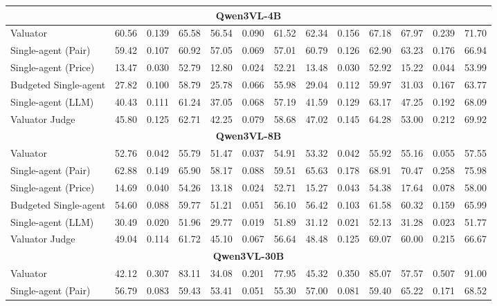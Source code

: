 \begin{table}[!t]
{\begin{tabular}{lcccccccccccc}
\midrule
\multicolumn{13}{c}{\textbf{Qwen3VL-4B}} \\
\midrule
Valuator                     & 60.56 & 0.139 & 65.58 & 56.54 & 0.090 & 61.52 & 62.34 & 0.156 & 67.18 & 67.97 & 0.239 & 71.70 \\
Single-agent (Pair)          & 59.42 & 0.107 & 60.92 & 57.05 & 0.069 & 57.01 & 60.79 & 0.126 & 62.90 & 63.23 & 0.176 & 66.94 \\
Single-agent (Price)         & 13.47 & 0.030 & 52.79 & 12.80 & 0.024 & 52.21 & 13.48 & 0.030 & 52.92 & 15.22 & 0.044 & 53.99 \\
Budgeted Single-agent        & 27.82 & 0.100 & 58.79 & 25.78 & 0.066 & 55.98 & 29.04 & 0.112 & 59.97 & 31.03 & 0.167 & 63.77 \\
Single-agent (LLM)           & 40.43 & 0.111 & 61.24 & 37.05 & 0.068 & 57.19 & 41.59 & 0.129 & 63.17 & 47.25 & 0.192 & 68.09 \\
Valuator Judge               & 45.80 & 0.125 & 62.71 & 42.25 & 0.079 & 58.68 & 47.02 & 0.145 & 64.28 & 53.00 & 0.212 & 69.92 \\
\midrule
\multicolumn{13}{c}{\textbf{Qwen3VL-8B}} \\
\midrule
Valuator                     & 52.76 & 0.042 & 55.79 & 51.47 & 0.037 & 54.91 & 53.32 & 0.042 & 55.92 & 55.16 & 0.055 & 57.55 \\
Single-agent (Pair)          & 62.88 & 0.149 & 65.90 & 58.17 & 0.088 & 59.51 & 65.63 & 0.178 & 68.91 & 70.47 & 0.258 & 75.98 \\
Single-agent (Price)         & 14.69 & 0.040 & 54.26 & 13.18 & 0.024 & 52.71 & 15.27 & 0.043 & 54.38 & 17.64 & 0.078 & 58.00 \\
Budgeted Single-agent        & 54.60 & 0.088 & 59.77 & 51.21 & 0.051 & 56.10 & 56.42 & 0.103 & 61.58 & 60.32 & 0.159 & 65.99 \\
Single-agent (LLM)           & 30.49 & 0.020 & 51.96 & 29.77 & 0.019 & 51.89 & 31.12 & 0.021 & 52.13 & 31.28 & 0.023 & 51.77 \\
Valuator Judge               & 49.04 & 0.114 & 61.72 & 45.10 & 0.067 & 56.64 & 48.48 & 0.125 & 69.07 & 60.00 & 0.215 & 66.67 \\
\midrule
\multicolumn{13}{c}{\textbf{Qwen3VL-30B}} \\
\midrule
Valuator                     & 42.12 & 0.307 & 83.11 & 34.08 & 0.201 & 77.95 & 45.32 & 0.350 & 85.07 & 57.57 & 0.507 & 91.00 \\
Single-agent (Pair)          & 56.79 & 0.083 & 59.43 & 53.41 & 0.051 & 55.30 & 57.00 & 0.081 & 59.40 & 65.22 & 0.171 & 68.52 \\

\end{tabular}}
\end{table}
